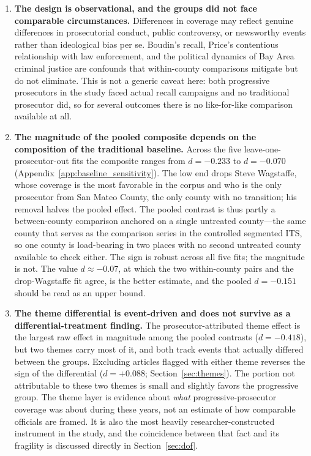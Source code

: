 \documentclass[12pt, letterpaper]{article}
\begin{document}
\begin{enumerate}[leftmargin=*, itemsep=6pt]

\item \textbf{The design is observational, and the groups did not face comparable circumstances.} Differences in coverage may reflect genuine differences in prosecutorial conduct, public controversy, or newsworthy events rather than ideological bias per se. Boudin's recall, Price's contentious relationship with law enforcement, and the political dynamics of Bay Area criminal justice are confounds that within-county comparisons mitigate but do not eliminate. This is not a generic caveat here: both progressive prosecutors in the study faced actual recall campaigns and no traditional prosecutor did, so for several outcomes there is no like-for-like comparison available at all.

\item \textbf{The magnitude of the pooled composite depends on the composition of the traditional baseline.} Across the five leave-one-prosecutor-out fits the composite ranges from $d = -0.233$ to $d = -0.070$ (Appendix~\ref{app:baseline_sensitivity}). The low end drops Steve Wagstaffe, whose coverage is the most favorable in the corpus and who is the only prosecutor from San Mateo County, the only county with no transition; his removal halves the pooled effect. The pooled contrast is thus partly a between-county comparison anchored on a single untreated county---the same county that serves as the comparison series in the controlled segmented ITS, so one county is load-bearing in two places with no second untreated county available to check either. The sign is robust across all five fits; the magnitude is not. The value $d \approx -0.07$, at which the two within-county pairs and the drop-Wagstaffe fit agree, is the better estimate, and the pooled $d = -0.151$ should be read as an upper bound.

\item \textbf{The theme differential is event-driven and does not survive as a differential-treatment finding.} The prosecutor-attributed theme effect is the largest raw effect in magnitude among the pooled contrasts ($d = -0.418$), but two themes carry most of it, and both track events that actually differed between the groups. Excluding articles flagged with either theme reverses the sign of the differential ($d = +0.088$; Section~\ref{sec:themes}). The portion not attributable to these two themes is small and slightly favors the progressive group. The theme layer is evidence about \emph{what} progressive-prosecutor coverage was about during these years, not an estimate of how comparable officials are framed. It is also the most heavily researcher-constructed instrument in the study, and the coincidence between that fact and its fragility is discussed directly in Section~\ref{sec:dof}.


\end{enumerate}
\end{document}
